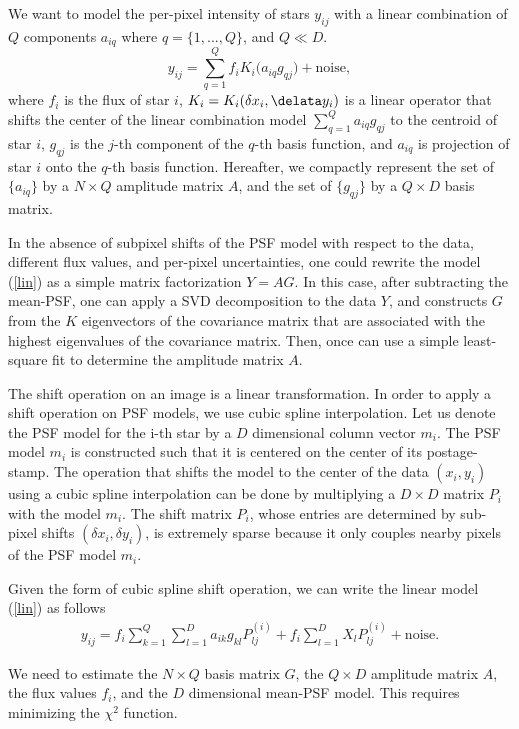 \documentclass[12pt,preprint]{aastex}
\newcommand{\beq}{\begin{equation}}
\newcommand{\eeq}{\end{equation}}
\begin{document}
We want to model the per-pixel intensity of stars $y_{ij}$ with
a linear combination of $Q$ components $a_{iq}$ where $q=\{1,...,Q\}$, and $Q\ll D$.
\beq
y_{ij} = \sum_{q=1}^{Q} f_{i}K_{i}\big(a_{iq}g_{qj}\big) + \text{noise},
\label{lin}
\eeq
where $f_{i}$ is the flux of star $i$, $K_{i} = K_{i}(\delta x_{i} , \delata y_{i})$
is a linear operator that shifts the center of the linear 
combination model $\sum_{q=1}^{Q}a_{iq}g_{qj}$ to the centroid 
of star $i$, $g_{qj}$ is the $j$-th component of the $q$-th 
basis function, and $a_{iq}$ is projection
of star $i$ onto the $q$-th basis function. 
Hereafter, we compactly represent the set
of $\{a_{iq}\}$ by a $N\times Q$ amplitude matrix $A$, 
and the set of $\{g_{qj}\}$
by a $Q\times D$ basis matrix.

 In the absence of subpixel shifts of the PSF model
with respect to the data, different flux values, and per-pixel 
uncertainties, one could rewrite the model (\ref{lin}) as a 
simple matrix factorization $Y = AG$. In this case, after 
subtracting the mean-PSF, one can apply a SVD decomposition 
to the data $Y$, and constructs $G$ from the $K$ eigenvectors 
of the covariance matrix that are associated with the highest 
eigenvalues of the covariance matrix. Then, once can use a simple 
least-square fit to determine the amplitude matrix $A$. 

The shift operation on an image is a linear transformation. In order to
apply a shift operation on PSF models, we use cubic spline interpolation.
Let us denote the PSF model for the i-th star by a $D$ dimensional column 
vector $m_{i}$. The PSF model $m_{i}$ is constructed such that it is centered
on the center of its postage-stamp. The operation that shifts the model to the
center of the data $(x_{i} , y_{i})$ using a cubic spline interpolation can
be done by multiplying a $D\times D$ matrix $P_{i}$ with  the model $m_{i}$.
The shift matrix $P_{i}$, whose entries are determined by sub-pixel shifts $(\delta x_{i}
, \delta y_{i})$, is extremely sparse because it only couples nearby pixels of 
the PSF model $m_{i}$.

Given the form of cubic spline shift operation, we can write the linear model 
(\ref{lin}) as follows
\begin{eqnarray}
y_{ij} = f_{i} \sum_{k=1}^{Q}\sum_{l=1}^{D} a_{ik}g_{kl}P^{(i)}_{lj} +
         f_{i}\sum_{l=1}^{D} X_{l}P^{(i)}_{lj} + \text{noise}.
\label{model}
\end{eqnarray}

We need to estimate the $N\times Q$ basis matrix $G$, the $Q \times D$ amplitude 
matrix $A$, the flux values $f_{i}$, and the $D$ dimensional mean-PSF model.
This requires minimizing the $\chi^{2}$ function.
\end{document}
